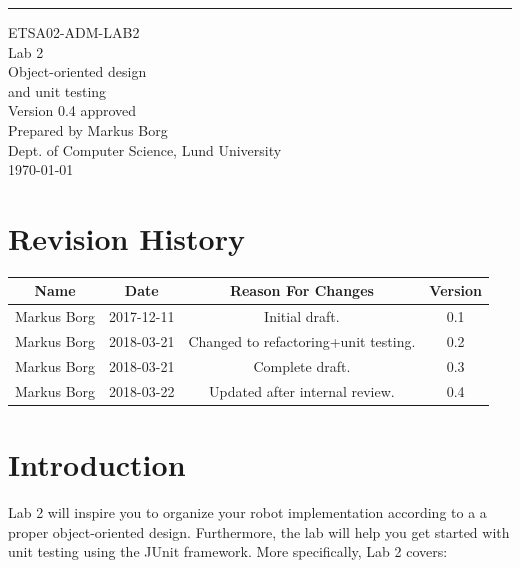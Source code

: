 \documentclass{scrreprt}
\date{}
\def\myversion{0.4 }
\begin{document}
\begin{flushright}
    \rule{16cm}{5pt}\vskip1cm
    \begin{bfseries}
    	\LARGE{ETSA02-ADM-LAB2}\\
    	\vspace{1.5cm}
        \Huge{Lab 2}\\
        \vspace{0.5cm}
        Object-oriented design\\
        \vspace{0.5cm}
        and unit testing\\
        \vspace{1.5cm}
        \LARGE{Version \myversion approved}\\
        \vspace{1.5cm}
        Prepared by Markus Borg\\
        Dept. of Computer Science, Lund University\\
        \vspace{1.5cm}
        \today\\
    \end{bfseries}
\end{flushright}


\chapter*{Revision History}

\begin{center}
    \begin{tabular}{|c|c|c|c|}
        \hline
	    Name & Date & Reason For Changes & Version\\
        \hline
	    Markus Borg & 2017-12-11 & Initial draft. & 0.1\\
        \hline
        Markus Borg & 2018-03-21 & Changed to refactoring+unit testing. & 0.2\\
        \hline
        Markus Borg & 2018-03-21 & Complete draft. & 0.3\\
        \hline
        Markus Borg & 2018-03-22 & Updated after internal review. & 0.4\\
        \hline
    \end{tabular}
\end{center}

\chapter{Introduction}
Lab 2 will inspire you to organize your robot implementation according to a a proper object-oriented design. Furthermore, the lab will help you get started with unit testing using the JUnit framework. More specifically, Lab 2 covers:
\end{document}
